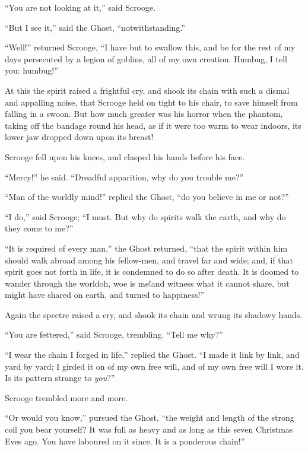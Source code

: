 \documentclass[paper=5.5in:8.5in,BCOR=7mm,twoside,DIV=calc,12pt,usegeometry]{scrbook} %
\begin{document}
\enquote{You are not looking at it,} said Scrooge.

\enquote{But I see it,} said the Ghost, \enquote{notwithstanding.}

\enquote{Well!} returned Scrooge, \enquote{I have but to swallow this, and be for the rest of my days persecuted by a legion of goblins, all of my own creation. Humbug, I tell you: humbug!}

At this the spirit raised a frightful cry, and shook its chain with such a dismal and appalling noise, that Scrooge held on tight to his chair, to save himself from falling in a swoon. But how much greater was his horror when the phantom, taking off the bandage round his head, as if it were too warm to wear indoors, its lower jaw dropped down upon its breast!

Scrooge fell upon his knees, and clasped his hands before his face.

\enquote{Mercy!} he said. \enquote{Dreadful apparition, why do you trouble me?}

\enquote{Man of the worldly mind!} replied the Ghost, \enquote{do you believe in me or not?}

\enquote{I do,} said Scrooge; \enquote{I must. But why do spirits walk the earth, and why do they come to me?}

\enquote{It is required of every man,} the Ghost returned, \enquote{that the spirit within him should walk abroad among his fellow-men, and travel far and wide; and, if that spirit goes not forth in life, it is condemned to do so after death. It is doomed to wander through the world\textemdash oh, woe is me!\textemdash and witness what it cannot share, but might have shared on earth, and turned to happiness!}

Again the spectre raised a cry, and shook its chain and wrung its shadowy hands.

\enquote{You are fettered,} said Scrooge, trembling. \enquote{Tell me why?}

\enquote{I wear the chain I forged in life,} replied the Ghost. \enquote{I made it link by link, and yard by yard; I girded it on of my own free will, and of my own free will I wore it. Is its pattern strange to \textit{you}?}

Scrooge trembled more and more.

\enquote{Or would you know,} pursued the Ghost, \enquote{the weight and length of the strong coil you bear yourself? It was full as heavy and as long as this seven Christmas Eves ago. You have laboured on it since. It is a ponderous chain!}
\end{document}
